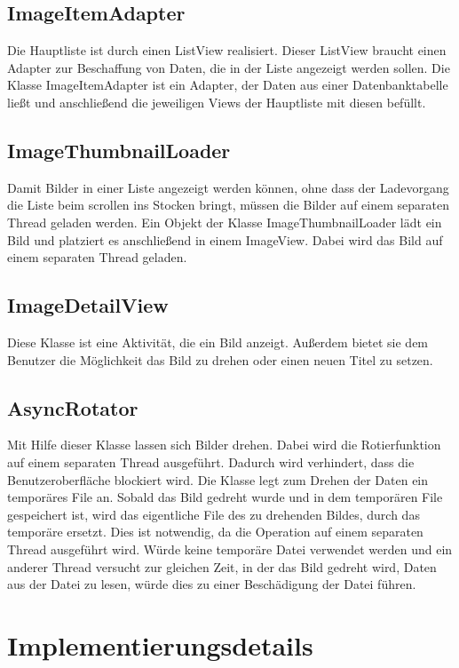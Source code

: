 \subsection{ImageItemAdapter}
Die Hauptliste ist durch einen ListView realisiert.
Dieser ListView braucht einen Adapter zur Beschaffung von Daten, die in der Liste angezeigt werden sollen.
Die Klasse ImageItemAdapter ist ein Adapter, der Daten aus einer Datenbanktabelle ließt
und anschließend die jeweiligen Views der Hauptliste mit diesen befüllt.

\subsection{ImageThumbnailLoader}
Damit Bilder in einer Liste angezeigt werden können,
ohne dass der Ladevorgang die Liste beim scrollen ins Stocken bringt, 
müssen die Bilder auf einem separaten Thread geladen werden.
Ein Objekt der Klasse ImageThumbnailLoader lädt ein Bild und platziert es anschließend
in einem ImageView.
Dabei wird das Bild auf einem separaten Thread geladen. 

\subsection{ImageDetailView}
Diese Klasse ist eine Aktivität, die ein Bild anzeigt. 
Außerdem bietet sie dem Benutzer die Möglichkeit das Bild zu drehen oder einen neuen Titel zu setzen.

\subsection{AsyncRotator}
Mit Hilfe dieser Klasse lassen sich Bilder drehen. 
Dabei wird die Rotierfunktion auf einem separaten Thread ausgeführt.
Dadurch wird verhindert, dass die Benutzeroberfläche blockiert wird.
Die Klasse legt zum Drehen der Daten ein temporäres File an.
Sobald das Bild gedreht wurde und in dem temporären File gespeichert ist, 
wird das eigentliche File des zu drehenden Bildes, durch das temporäre ersetzt.
Dies ist notwendig, da die Operation auf einem separaten Thread ausgeführt wird.
Würde keine temporäre Datei verwendet werden und ein anderer Thread versucht 
zur gleichen Zeit, in der das Bild gedreht wird, Daten aus der Datei zu lesen,
würde dies zu einer Beschädigung der Datei führen.

\section{Implementierungsdetails}


